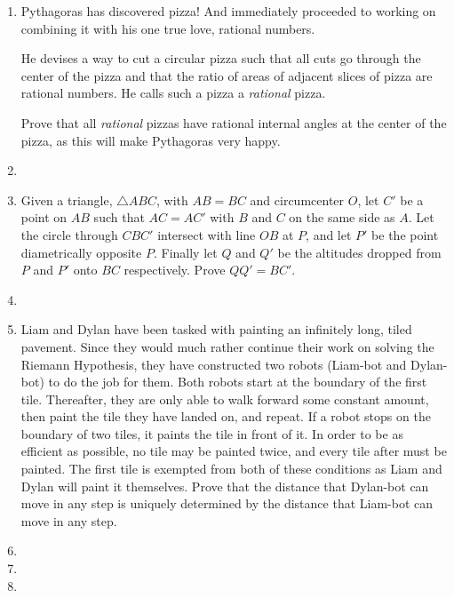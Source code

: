 \documentclass{article}
\begin{document}
\begin{enumerate}

\medskip
\item %
Pythagoras has discovered pizza! And immediately proceeded to working on combining it with his one true love, rational numbers.

He devises a way to cut a circular pizza such that all cuts go through the center of the pizza and that the ratio of areas of adjacent slices of pizza are rational numbers. He calls such a pizza a \textit{rational} pizza.

Prove that all \textit{rational} pizzas have rational internal angles at the center of the pizza, as this will make Pythagoras very happy.

\medskip
\item  %

\medskip
\item %
Given a triangle, $\triangle ABC$, with $AB = BC$ and circumcenter $O$, let $C'$ be a point on $AB$ such that $AC = AC'$ with $B$ and $C$ on the same side as $A$. Let the circle through $CBC'$ intersect with line $OB$ at $P$, and let $P'$ be the point diametrically opposite $P$. Finally let $Q$ and $Q'$ be the altitudes dropped from $P$ and $P'$ onto $BC$ respectively. Prove $QQ' = BC'$.

\medskip
\item %

\medskip
\item %
Liam and Dylan have been tasked with painting an infinitely long, tiled pavement. Since they would much rather continue their work on solving the Riemann Hypothesis, they have constructed two robots (Liam-bot and Dylan-bot) to do the job for them. Both robots start at the boundary of the first tile. Thereafter, they are only able to walk forward some constant amount, then paint the tile they have landed on, and repeat. If a robot stops on the boundary of two tiles, it paints the tile in front of it. In order to be as efficient as possible, no tile may be painted twice, and every tile after must be painted. The first tile is exempted from both of these conditions as Liam and Dylan will paint it themselves. Prove that the distance that Dylan-bot can move in any step is uniquely determined by the distance that Liam-bot can move in any step.

\medskip
\item %

\medskip
\item %

\medskip
\item %
\end{enumerate}
\end{document}
